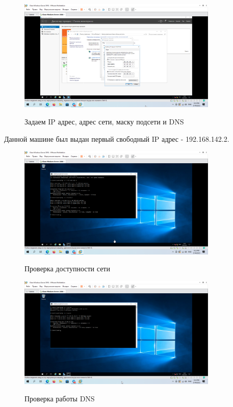 \documentclass[a4paper]{article}
\begin{document}
  \begin{figure}[H]
    \centering
    \includegraphics[width=0.85\textwidth]{5_0019}
    \label{img:19}
    \caption{Задаем IP адрес, адрес сети, маску подсети и DNS}
  \end{figure}

  Данной машине был выдан первый свободный IP адрес - 192.168.142.2.

  \begin{figure}[H]
    \centering
    \includegraphics[width=0.85\textwidth]{5_0020}
    \label{img:20}
    \caption{Проверка доступности сети}
  \end{figure}

  \begin{figure}[H]
    \centering
    \includegraphics[width=0.85\textwidth]{5_0021}
    \label{img:21}
    \caption{Проверка работы DNS}
  \end{figure}
\end{document}
